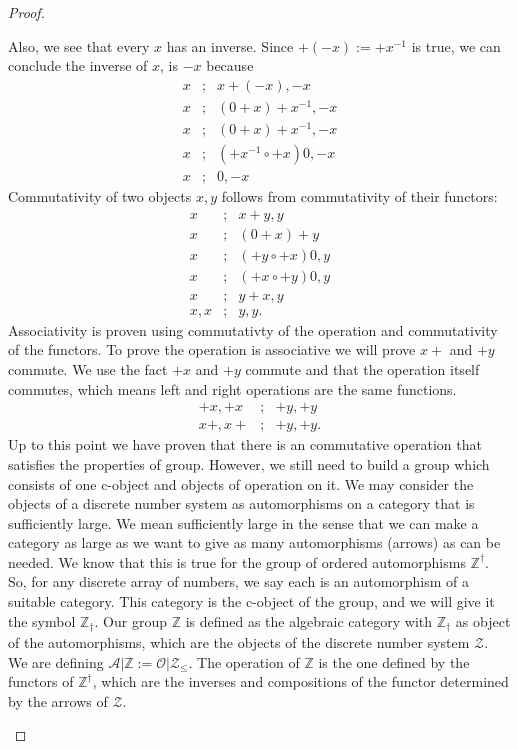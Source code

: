 \documentclass [12pt]{book}
\begin{document}
\begin{proof}
\begin{itemize}
Also, we see that every $x$ has an inverse. Since $+(-x):=+x^{-1}$ is true, we can conclude the inverse of $x$, is $-x$ because\begin{eqnarray}\nonumber x&;&x+(-x),-x\\\nonumber x&;&(0+x)+x^{-1},-x\\\nonumber x&;&(0+x)+x^{-1},-x\\\nonumber x&;&(+x^{-1}\circ+x)0,-x\\\nonumber x&;&0,-x\end{eqnarray}Commutativity of two objects $x,y$ follows from commutativity of their functors:\begin{eqnarray}\nonumber x&;&x+y,y\\\nonumber x&;&(0+x)+y\\\nonumber x&;&(+y\circ+x)0,y\\\nonumber x&;&(+x\circ+y)0,y\\\nonumber x&;&y+x,y\\\nonumber x,x&;&y,y.\end{eqnarray}Associativity is proven using commutativty of the operation and commutativity of the functors. To prove the operation is associative we will prove $x+$ and $+y$ commute. We use the fact $+x$ and $+y$ commute and that the operation itself commutes, which means left and right operations are the same functions.\begin{eqnarray}\nonumber +x,+x&;&+y,+y\\\nonumber x+,x+&;&+y,+y.\end{eqnarray}Up to this point we have proven that there is an commutative operation that satisfies the properties of group. However, we still need to build a group which consists of one c-object and objects of operation on it. We may consider the objects of a discrete number system as automorphisms on a category that is sufficiently large. We mean sufficiently large in the sense that we can make a category as large as we want to give as many automorphisms (arrows) as can be needed. We know that this is true for the group of ordered automorphisms $\mathbb Z^\dagger$. So, for any discrete array of numbers, we say each is an automorphism of a suitable category. This category is the c-object of the group, and we will give it the symbol $\mathbb Z_\dagger$. Our group $\mathbb Z$ is defined as the algebraic category with $\mathbb Z_\dagger$ as object of the automorphisms, which are the objects of the discrete number system $\mathcal Z$. We are defining $\mathcal A|\mathbb Z:=\mathcal{O|Z_\leq}$. The operation of $\mathbb Z$ is the one defined by the functors of $\mathbb Z^\dagger$, which are the inverses and compositions of the functor determined by the arrows of $\mathcal Z$.


\end{itemize}
\end{proof}
\end{document}
